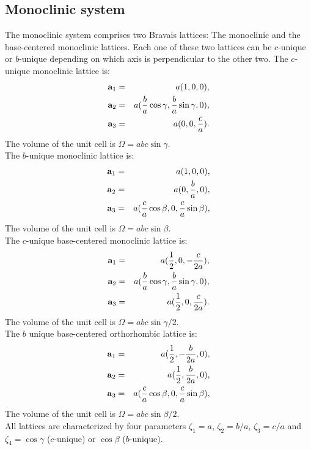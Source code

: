 \documentclass[12pt,a4paper]{article}
\begin{document}
\subsection{\color{web-blue}Monoclinic system}
The monoclinic system comprises two Bravais lattices:
The monoclinic and the base-centered monoclinic lattices.
Each one of these two lattices can be $c$-unique or $b$-unique depending on
which axis is perpendicular to the other two. 
The $c$-unique monoclinic lattice is:
\begin{eqnarray}
{\bf a}_1 &=& a (1, 0, 0), \nonumber \\
{\bf a}_2 &=& a ({b \over a} \cos{\gamma}, {b \over a}\sin{\gamma}, 0), \nonumber \\
{\bf a}_3 &=& a (0, 0, {c \over a}). 
\nonumber
\end{eqnarray}
The volume of the unit cell is $\Omega = abc \sin\gamma$. \\
The $b$-unique monoclinic lattice is:
\begin{eqnarray}
{\bf a}_1 &=& a (1, 0, 0), \nonumber \\
{\bf a}_2 &=& a (0, {b \over a}, 0), \nonumber \\
{\bf a}_3 &=& a ({c \over a} \cos{\beta}, 0, {c \over a}\sin{\beta}), \nonumber 
\end{eqnarray}
The volume of the unit cell is $\Omega = abc \sin\beta$. \\
The $c$-unique base-centered monoclinic lattice is:
\begin{eqnarray}
{\bf a}_1 &=& a ({1\over 2}, 0, -{c \over 2 a}), \nonumber \\
{\bf a}_2 &=& a ({b \over a} \cos{\gamma}, {b \over a}\sin{\gamma}, 0), \nonumber \\
{\bf a}_3 &=& a ({1\over 2}, 0, {c \over 2 a}). 
\nonumber
\end{eqnarray}
The volume of the unit cell is $\Omega = abc \sin\gamma/2$. \\
The $b$ unique base-centered orthorhombic lattice is:
\begin{eqnarray}
{\bf a}_1 &=& a ({1\over 2}, -{b \over 2 a}, 0), \nonumber \\
{\bf a}_2 &=& a ({1\over 2}, {b \over 2 a}, 0), \nonumber \\
{\bf a}_3 &=& a ({c \over a} \cos{\beta}, 0, {c \over a}\sin{\beta}), \nonumber 
\end{eqnarray}
The volume of the unit cell is $\Omega = abc \sin\beta/2$. \\
All lattices are characterized by four parameters $\zeta_1=a$, $\zeta_2=b/a$,
$\zeta_3=c/a$ and $\zeta_4=\cos\gamma$
($c$-unique) or $\cos\beta$ ($b$-unique).
\end{document}
